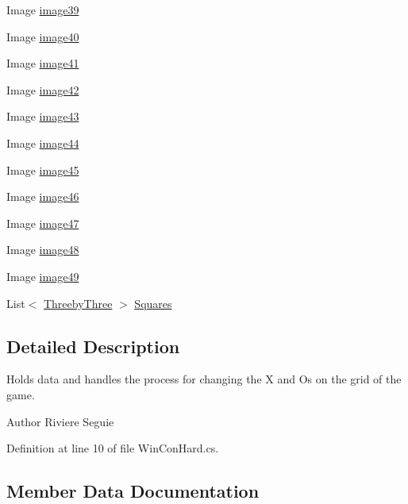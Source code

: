 \begin{DoxyCompactItemize}
\item 
Image \mbox{\hyperlink{class_win_con_hard_aa40f140f05a6cf720b2cf0cb4fa1a6a5}{image39}}
\item 
Image \mbox{\hyperlink{class_win_con_hard_acd1a93ee7e72b9c7b7f51ed639d24d98}{image40}}
\item 
Image \mbox{\hyperlink{class_win_con_hard_ab39f0eee62ffcca5d594221a566c8375}{image41}}
\item 
Image \mbox{\hyperlink{class_win_con_hard_a88eca52625dbe9a307c9ffc362f29349}{image42}}
\item 
Image \mbox{\hyperlink{class_win_con_hard_a8a07d6ff9cc41b6f56589f00b946404e}{image43}}
\item 
Image \mbox{\hyperlink{class_win_con_hard_a5ee301d2c349e2279be56127bb80e848}{image44}}
\item 
Image \mbox{\hyperlink{class_win_con_hard_abdf37b77124f68bda0c9265c58759041}{image45}}
\item 
Image \mbox{\hyperlink{class_win_con_hard_a067d066c87e0af8bf62975ef5ae7cf5f}{image46}}
\item 
Image \mbox{\hyperlink{class_win_con_hard_a9fe29d059bbd1c04a4858bf4a6a97d3b}{image47}}
\item 
Image \mbox{\hyperlink{class_win_con_hard_aafe8e627fbb2c13f9c6df1665171789e}{image48}}
\item 
Image \mbox{\hyperlink{class_win_con_hard_aef1f591959921a08c15864014795b8f9}{image49}}
\item 
List$<$ \mbox{\hyperlink{class_threeby_three}{Threeby\+Three}} $>$ \mbox{\hyperlink{class_win_con_hard_a58fc7d56cc69a33e6dcee18e5bda4622}{Squares}}
\end{DoxyCompactItemize}


\subsection{Detailed Description}
Holds data and handles the process for changing the X and Os on the grid of the game. \begin{DoxyAuthor}{Author}
Riviere Seguie 
\end{DoxyAuthor}


Definition at line 10 of file Win\+Con\+Hard.\+cs.



\subsection{Member Data Documentation}
\mbox{\label{class_win_con_hard_ac8813458f4edad866699cc841fa0bc16}} 
